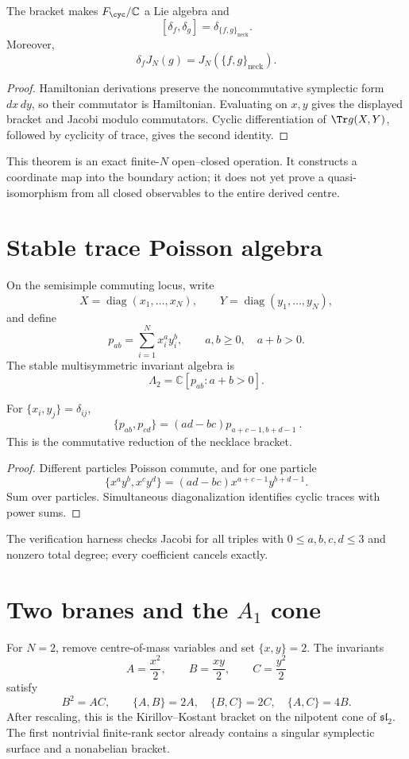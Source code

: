 \begin{theorem}\label{thm:necklace}
The bracket makes \(F_{\cyc}/\mathbb C\) a Lie algebra and
\[
 [\delta_f,\delta_g]=\delta_{\{f,g\}_{\mathrm{neck}}}.
\]
Moreover,
\[
 \delta_fJ_N(g)=J_N(\{f,g\}_{\mathrm{neck}}).
\]
\end{theorem}
\begin{proof}
Hamiltonian derivations preserve the noncommutative symplectic form \(dx\,dy\), so their commutator is Hamiltonian.  Evaluating on \(x,y\) gives the displayed bracket and Jacobi modulo commutators.  Cyclic differentiation of \(\Tr g(X,Y)\), followed by cyclicity of trace, gives the second identity.
\end{proof}

This theorem is an exact finite-\(N\) open--closed operation.  It constructs a coordinate map into the boundary action; it does not yet prove a quasi-isomorphism from all closed observables to the entire derived centre.

\section{Stable trace Poisson algebra}
On the semisimple commuting locus, write
\[
 X=\operatorname{diag}(x_1,\ldots,x_N),
 \qquad
 Y=\operatorname{diag}(y_1,\ldots,y_N),
\]
and define
\[
 p_{ab}=\sum_{i=1}^Nx_i^ay_i^b,
 \qquad a,b\ge0,\quad a+b>0.
\]
The stable multisymmetric invariant algebra is
\[
 \Lambda_2=\mathbb C[p_{ab}:a+b>0].
\]

\begin{theorem}\label{thm:stable-trace}
For \(\{x_i,y_j\}=\delta_{ij}\),
\[
 \boxed{\ \{p_{ab},p_{cd}\}=(ad-bc)p_{a+c-1,b+d-1}\ }.
\]
This is the commutative reduction of the necklace bracket.
\end{theorem}
\begin{proof}
Different particles Poisson commute, and for one particle
\[
 \{x^ay^b,x^cy^d\}=(ad-bc)x^{a+c-1}y^{b+d-1}.
\]
Sum over particles.  Simultaneous diagonalization identifies cyclic traces with power sums.
\end{proof}

The verification harness checks Jacobi for all triples with \(0\le a,b,c,d\le3\) and nonzero total degree; every coefficient cancels exactly.

\section{Two branes and the \(A_1\) cone}
For \(N=2\), remove centre-of-mass variables and set \(\{x,y\}=2\).  The invariants
\[
 A=\frac{x^2}{2},
 \qquad B=\frac{xy}{2},
 \qquad C=\frac{y^2}{2}
\]
satisfy
\[
 B^2=AC,
 \qquad
 \{A,B\}=2A,
 \quad \{B,C\}=2C,
 \quad \{A,C\}=4B.
\]
After rescaling, this is the Kirillov--Kostant bracket on the nilpotent cone of \(\mathfrak{sl}_2\).  The first nontrivial finite-rank sector already contains a singular symplectic surface and a nonabelian bracket.

